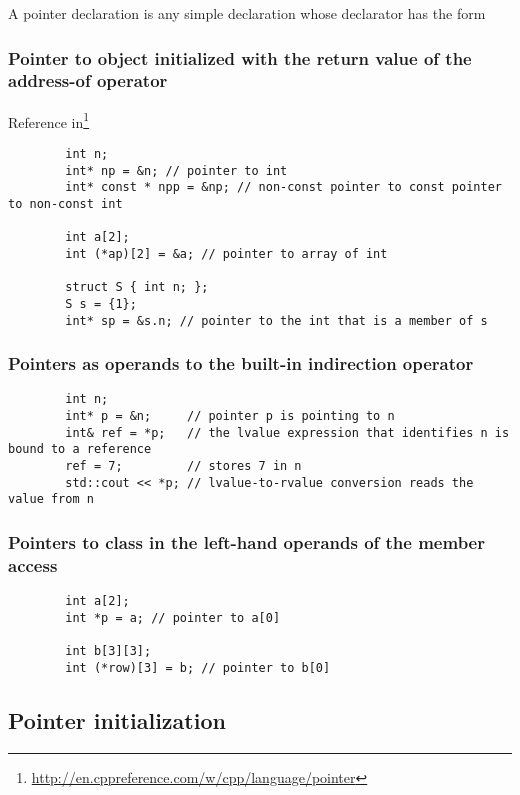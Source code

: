 \documentclass[12pt]{article}
\begin{document}
\begin{itemize}
		A pointer declaration is any simple declaration whose declarator has the form



		\subsubsection{Pointer to object initialized with the return value of the address-of operator}
		Reference in\footnote{\url{http://en.cppreference.com/w/cpp/language/pointer}} 

		\begin{verbatim}
		int n;
		int* np = &n; // pointer to int
		int* const * npp = &np; // non-const pointer to const pointer to non-const int
		 
		int a[2];
		int (*ap)[2] = &a; // pointer to array of int
		 
		struct S { int n; };
		S s = {1};
		int* sp = &s.n; // pointer to the int that is a member of s
		\end{verbatim}

		\subsubsection{Pointers as operands to the built-in indirection operator}

		\begin{verbatim}
		int n;
		int* p = &n;     // pointer p is pointing to n
		int& ref = *p;   // the lvalue expression that identifies n is bound to a reference
		ref = 7;         // stores 7 in n
		std::cout << *p; // lvalue-to-rvalue conversion reads the value from n
		\end{verbatim}

		\subsubsection{Pointers to class in the left-hand operands of the member access}

		\begin{verbatim}
		int a[2];
		int *p = a; // pointer to a[0]
		 
		int b[3][3];
		int (*row)[3] = b; // pointer to b[0]
		\end{verbatim}

	\subsection{Pointer initialization}


\end{itemize}
\end{document}
